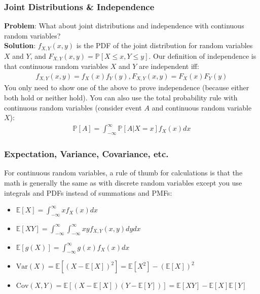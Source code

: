 \documentclass{beamer}
\begin{document}
\begin{frame}
    \frametitle{Joint Distributions \& Independence}
    {\bf Problem}: What about joint distributions and independence with continuous random variables?\\
    {\bf Solution}: $f_{X,Y}(x,y)$ is the PDF of the joint distribution for random variables $X$ and $Y$, and $F_{X,Y}(x,y)=\mathbb{P}[X\leq x,Y\leq y]$. Our definition of independence is that continuous random variables $X$ and $Y$ are independent iff:
    \begin{align*}
        f_{X,Y}(x,y)=f_X(x)f_Y(y),F_{X,Y}(x,y)=F_X(x)F_Y(y)
    \end{align*}
    You only need to show one of the above to prove independence (because either both hold or neither hold). You can also use the total probability rule with continuous random variables (consider event $A$ and continuous random variable $X$):
    \begin{align*}
        \mathbb{P}[A]=\int_{-\infty}^\infty\mathbb{P}[A|X=x]f_X(x)dx
    \end{align*}
\end{frame}

\begin{frame}
    \frametitle{Expectation, Variance, Covariance, etc.}
    For continuous random variables, a rule of thumb for calculations is that the math is generally the same as with discrete random variables except you use integrals and PDFs instead of summations and PMFs:
    \begin{itemize}
        \item $\mathbb{E}[X]=\int_{-\infty}^\infty xf_X(x)dx$
        \item $\mathbb{E}[XY]=\int_{-\infty}^\infty\int_{-\infty}^\infty xyf_{X,Y}(x,y)dydx$
        \item $\mathbb{E}[g(X)]=\int_{-\infty}^\infty g(x)f_X(x)dx$ 
        \item $\text{Var}(X)=\mathbb{E}\left[(X-\mathbb{E}[X])^2\right]=\mathbb{E}\left[X^2\right]-(\mathbb{E}[X])^2$
        \item $\text{Cov}(X,Y)=\mathbb{E}[(X-\mathbb{E}[X])(Y-\mathbb{E}[Y])]=\mathbb{E}[XY]-\mathbb{E}[X]\mathbb{E}[Y]$
    \end{itemize}
\end{frame}
\end{document}
